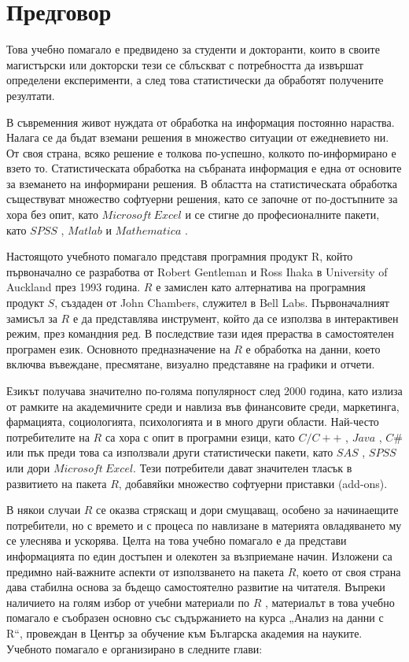 \newpage
{}
\chapter*{Предговор}
\setcounter{page}{1}
\thispagestyle{empty}

Това учебно помагало е предвидено за студенти и докторанти, които в своите магистърски или докторски тези се сблъскват с потребността да извършат определени експерименти, а след това статистически да обработят получените резултати.

В съвременния живот нуждата от обработка на информация постоянно нараства. Налага се да бъдат вземани решения в множество ситуации от ежедневието ни. От своя страна, всяко решение е толкова по-успешно, колкото по-информирано е взето то. Статистическата обработка на събраната информация е една от основите за вземането на информирани решения. В областта на статистическата обработка съществуват множество софтуерни решения, като се започне от по-достъпните за хора без опит, като $Microsoft\ Excel$ и се стигне до професионалните пакети, като $SPSS$ \cite{spss}, $Matlab$ \cite{matlab} и $Mathematica$ \cite{mathematica}.

Настоящото учебното помагало представя програмния продукт R, който първоначално се разработва от Robert Gentleman и Ross Ihaka в University of Auckland през 1993 година. $R$ е замислен като алтернатива на програмния продукт $S$, създаден от John Chambers, служител в Bell Labs. Първоначалният замисъл за $R$ е да представлява инструмент, който да се използва в интерактивен режим, през командния ред. В последствие тази идея прераства в самостоятелен програмен език. Основното предназначение на $R$ е обработка на данни, което включва въвеждане, пресмятане, визуално представяне на графики и отчети.

Езикът получава значително по-голяма популярност след 2000 година, като излиза от рамките на академичните среди и навлиза във финансовите среди, маркетинга, фармацията, социологията, психологията и в много други области. Най-често потребителите на $R$ са хора с опит в програмни езици, като $C/C++$ \cite{cpp}, $Java$ \cite{java}, $C\#$ \cite{csharp} или пък преди това са използвали други статистически пакети, като $SAS$ \cite{sas}, $SPSS$ или дори $Microsoft\ Excel$. Тези потребители дават значителен тласък в развитието на пакета $R$, добавяйки множество софтуерни приставки (add-ons).

В някои случаи $R$ се оказва стряскащ и дори смущаващ, особено за начинаещите потребители, но с времето и с процеса по навлизане в материята овладяването му се улеснява и ускорява. Целта на това учебно помагало е да представи информацията по един достъпен и олекотен за възприемане начин. Изложени са предимно най-важните аспекти от използването на пакета $R$, което от своя страна дава стабилна основа за бъдещо самостоятелно развитие на читателя. Въпреки наличието на голям избор от учебни материали по $R$ \cite{r01,r02,r03,r04,r05,r06,r07,r08,r09,r10}, материалът в това учебно помагало е съобразен основно със съдържанието на курса „Анализ на данни с R“, провеждан в Център за обучение към Българска академия на науките. Учебното помагало е организирано в следните глави:


